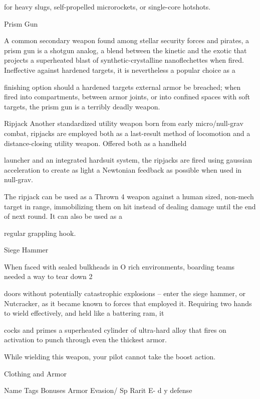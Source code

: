 for heavy slugs, self-propelled microrockets, or single-core hotshots.

Prism Gun

A common secondary weapon found among stellar security forces and pirates, a prism gun is a shotgun
analog, a blend between the kinetic and the exotic that projects a superheated blast of synthetic-crystalline
nanoflechettes when fired. Ineffective against hardened targets, it is nevertheless a popular choice as a

finishing option should a hardened targets external armor be breached; when fired into compartments,
between armor joints, or into confined spaces with soft targets, the prism gun is a terribly deadly weapon.

Ripjack
Another standardized utility weapon born from early micro/null-grav combat, ripjacks are employed both as
a last-result method of locomotion and a distance-closing utility weapon. Offered both as a handheld

launcher and an integrated hardsuit system, the ripjacks are fired using gaussian acceleration to create as
light a Newtonian feedback as possible when used in null-grav.




The ripjack can be used as a Thrown 4 weapon against a human sized, non-mech target in range,
immobilizing them on hit instead of dealing damage until the end of next round. It can also be used as a

regular grappling hook.


Siege Hammer

When faced with sealed bulkheads in O   rich environments, boarding teams needed a way to tear down
                                             2

doors without potentially catastrophic explosions -- enter the siege hammer, or Nutcracker, as it became
known to forces that employed it. Requiring two hands to wield effectively, and held like a battering ram, it

cocks and primes a superheated cylinder of ultra-hard alloy that fires on activation to punch through even
the thickest armor.

While wielding this weapon, your pilot cannot take the boost action.


                                                 Clothing and Armor

 Name                                  Tags          Bonuses                        Armor     Evasion/      Sp     Rarit
                                                                                              E-            d      y
                                                                                              defense

